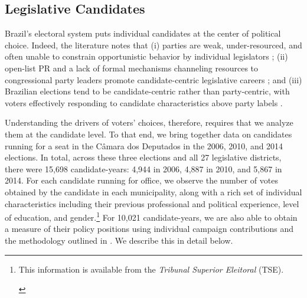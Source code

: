 \documentclass[12pt,english]{article}
\newcommand{\note}[1]{\footnote{ \begin{doublespace}#1  \end{doublespace}}}
\numberwithin{equation}{section}
\theoremstyle{plain}
\theoremstyle{remark}
\theoremstyle{plain}
\newcommand{\red}[1]{\textcolor{red}{#1}}
\begin{document}
\subsection{Legislative Candidates  \label{candidates}}


Brazil's electoral system puts individual candidates at the center of political choice. Indeed, the literature notes that (i) parties are weak, under-resourced, and often unable to constrain opportunistic behavior by individual legislators \cite{Samuels2003,Desposato2006,KlavsnjaTitiunik2017}; (ii) open-list PR and a lack of formal mechanisms channeling resources to congressional party leaders promote candidate-centric legislative careers \cite{Mainwaring1995,Samuels2003}; and (iii) %
Brazilian elections tend to be candidate-centric rather than party-centric, with voters effectively responding to candidate characteristics above party labels \cite{Mainwaring1995,Samuels2003,KlavsnjaTitiunik2017}.

Understanding the drivers of voters' choices, therefore, requires that we analyze them at the candidate level. %
To that end, we bring together data on candidates running for a seat in the C\^{a}mara dos Deputados in the 2006, 2010, and 2014 elections. In total, across these three elections and all 27 legislative districts, there were 15,698 candidate-years: 4,944 in 2006, 4,887 in 2010, and 5,867 in 2014.  For each candidate running for office, we observe the number of votes obtained by the candidate in each municipality, along with a %
 rich set of individual characteristics including their previous professional and political experience, level of education, and gender.\note{\normalsize This information is available from the \emph{Tribunal Superior Eleitoral} (TSE).} %
For 10,021 candidate-years, we are also able to obtain a measure of their policy positions using individual campaign contributions and the methodology outlined in . We describe this in detail below. 
\end{document}
